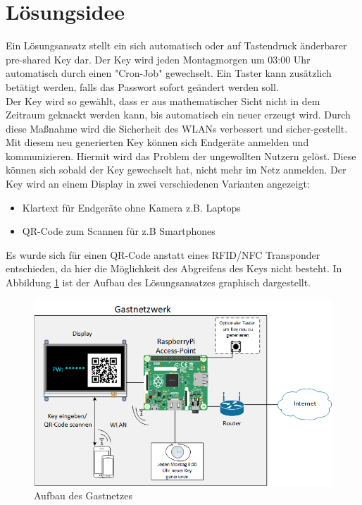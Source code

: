 \documentclass[a4paper,11pt,singlespacing]{article}
\begin{document}
	\section{Lösungsidee}
    	Ein Lösungsansatz stellt ein sich automatisch oder auf Tastendruck änderbarer pre-shared Key dar. Der Key wird jeden Montagmorgen um 03:00 Uhr automatisch durch einen "Cron-Job" gewechselt. Ein Taster kann zusätzlich betätigt werden, falls das Passwort sofort geändert werden soll. \\
		Der Key wird so gewählt, dass er aus mathematischer Sicht nicht in dem Zeitraum geknackt werden kann, bis automatisch ein neuer erzeugt wird. Durch diese Maßnahme wird die Sicherheit des WLANs verbessert und sicher-gestellt.
		Mit diesem neu generierten Key können sich Endgeräte anmelden und kommunizieren. Hiermit wird das Problem der ungewollten Nutzern gelöst. Diese können sich sobald der Key gewechselt hat, nicht mehr im Netz anmelden. Der Key wird an einem Display in zwei verschiedenen Varianten angezeigt:
		\begin{itemize}
			\item Klartext für Endgeräte ohne Kamera z.B. Laptops
			\item QR-Code zum Scannen für z.B Smartphones
		\end{itemize}

		Es wurde sich für einen QR-Code anstatt eines RFID/NFC Transponder entschieden, da hier die Möglichkeit des Abgreifens des Keys nicht besteht. In Abbildung  \ref{aufbau} ist der Aufbau des Lösungsansatzes graphisch dargestellt. 

		\begin{figure}[ht]
			\centering
			\includegraphics[scale=0.6]{skizze}
				\caption{Aufbau des Gastnetzes}
				\label{aufbau}
		\end{figure}
\end{document}
